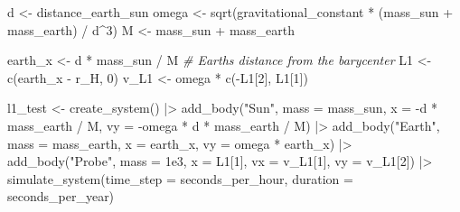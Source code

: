 \documentclass[
  10.5pt,
  letterpaper,
]{scrbook}
\newenvironment{Shaded}{\begin{snugshade}}{\end{snugshade}}
\newcommand{\AttributeTok}[1]{\textcolor[rgb]{0.00,0.00,0.00}{#1}}
\newcommand{\CommentTok}[1]{\textcolor[rgb]{0.00,0.00,0.00}{\textit{#1}}}
\newcommand{\DecValTok}[1]{\textcolor[rgb]{0.00,0.00,0.00}{#1}}
\newcommand{\FloatTok}[1]{\textcolor[rgb]{0.00,0.00,0.00}{#1}}
\newcommand{\FunctionTok}[1]{\textcolor[rgb]{0.00,0.00,0.00}{#1}}
\newcommand{\NormalTok}[1]{\textcolor[rgb]{0.00,0.00,0.00}{#1}}
\newcommand{\OtherTok}[1]{\textcolor[rgb]{0.00,0.00,0.00}{#1}}
\newcommand{\SpecialCharTok}[1]{\textcolor[rgb]{0.00,0.00,0.00}{#1}}
\newcommand{\StringTok}[1]{\textcolor[rgb]{0.00,0.00,0.00}{#1}}
\theoremstyle{definition}
\theoremstyle{plain}
\theoremstyle{remark}
\begin{document}
\begin{Shaded}
\begin{Highlighting}[]
\NormalTok{d     }\OtherTok{\textless{}{-}}\NormalTok{ distance\_earth\_sun}
\NormalTok{omega }\OtherTok{\textless{}{-}} \FunctionTok{sqrt}\NormalTok{(gravitational\_constant }\SpecialCharTok{*}\NormalTok{ (mass\_sun }\SpecialCharTok{+}\NormalTok{ mass\_earth) }\SpecialCharTok{/}\NormalTok{ d}\SpecialCharTok{\^{}}\DecValTok{3}\NormalTok{)}
\NormalTok{M     }\OtherTok{\textless{}{-}}\NormalTok{ mass\_sun }\SpecialCharTok{+}\NormalTok{ mass\_earth}

\NormalTok{earth\_x }\OtherTok{\textless{}{-}}\NormalTok{ d }\SpecialCharTok{*}\NormalTok{ mass\_sun }\SpecialCharTok{/}\NormalTok{ M           }\CommentTok{\# Earth\textquotesingle{}s distance from the barycenter}
\NormalTok{L1      }\OtherTok{\textless{}{-}} \FunctionTok{c}\NormalTok{(earth\_x }\SpecialCharTok{{-}}\NormalTok{ r\_H, }\DecValTok{0}\NormalTok{)}
\NormalTok{v\_L1    }\OtherTok{\textless{}{-}}\NormalTok{ omega }\SpecialCharTok{*} \FunctionTok{c}\NormalTok{(}\SpecialCharTok{{-}}\NormalTok{L1[}\DecValTok{2}\NormalTok{], L1[}\DecValTok{1}\NormalTok{])}

\NormalTok{l1\_test }\OtherTok{\textless{}{-}} \FunctionTok{create\_system}\NormalTok{() }\SpecialCharTok{|\textgreater{}}
  \FunctionTok{add\_body}\NormalTok{(}\StringTok{"Sun"}\NormalTok{,   }\AttributeTok{mass =}\NormalTok{ mass\_sun,   }\AttributeTok{x =} \SpecialCharTok{{-}}\NormalTok{d }\SpecialCharTok{*}\NormalTok{ mass\_earth }\SpecialCharTok{/}\NormalTok{ M,}
           \AttributeTok{vy =} \SpecialCharTok{{-}}\NormalTok{omega }\SpecialCharTok{*}\NormalTok{ d }\SpecialCharTok{*}\NormalTok{ mass\_earth }\SpecialCharTok{/}\NormalTok{ M) }\SpecialCharTok{|\textgreater{}}
  \FunctionTok{add\_body}\NormalTok{(}\StringTok{"Earth"}\NormalTok{, }\AttributeTok{mass =}\NormalTok{ mass\_earth, }\AttributeTok{x =}\NormalTok{ earth\_x, }\AttributeTok{vy =}\NormalTok{ omega }\SpecialCharTok{*}\NormalTok{ earth\_x) }\SpecialCharTok{|\textgreater{}}
  \FunctionTok{add\_body}\NormalTok{(}\StringTok{"Probe"}\NormalTok{, }\AttributeTok{mass =} \FloatTok{1e3}\NormalTok{, }\AttributeTok{x =}\NormalTok{ L1[}\DecValTok{1}\NormalTok{], }\AttributeTok{vx =}\NormalTok{ v\_L1[}\DecValTok{1}\NormalTok{], }\AttributeTok{vy =}\NormalTok{ v\_L1[}\DecValTok{2}\NormalTok{]) }\SpecialCharTok{|\textgreater{}}
  \FunctionTok{simulate\_system}\NormalTok{(}\AttributeTok{time\_step =}\NormalTok{ seconds\_per\_hour, }\AttributeTok{duration =}\NormalTok{ seconds\_per\_year)}
\end{Highlighting}
\end{Shaded}
\end{document}
